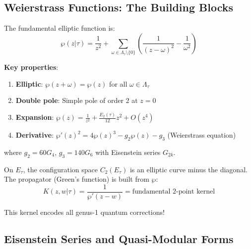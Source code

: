 \subsection{Weierstrass Functions: The Building Blocks}

\begin{definition}
\label{def:weierstrass-p}
The fundamental elliptic function is:
\begin{equation}
\wp(z|\tau) = \frac{1}{z^2} + \sum_{\omega \in \Lambda_\tau \setminus \{0\}} 
\left(\frac{1}{(z-\omega)^2} - \frac{1}{\omega^2}\right)
\end{equation}

\textbf{Key properties}:
\begin{enumerate}
\item \textbf{Elliptic}: $\wp(z + \omega) = \wp(z)$ for all $\omega \in \Lambda_\tau$
\item \textbf{Double pole}: Simple pole of order 2 at $z = 0$
\item \textbf{Expansion}: $\wp(z) = \frac{1}{z^2} + \frac{E_2(\tau)}{12} z^2 + O(z^4)$
\item \textbf{Derivative}: $\wp'(z)^2 = 4\wp(z)^3 - g_2\wp(z) - g_3$ (Weierstrass equation)
\end{enumerate}

where $g_2 = 60G_4$, $g_3 = 140G_6$ with Eisenstein series $G_{2k}$.
\end{definition}

\begin{remark}
\label{rem:wp-config-space}
On $E_\tau$, the configuration space $C_2(E_\tau)$ is an elliptic curve minus the diagonal.
The propagator (Green's function) is built from $\wp$:
\begin{equation}
K(z,w|\tau) = \frac{1}{\wp'(z-w)} = \text{fundamental 2-point kernel}
\end{equation}

This kernel encodes all genus-1 quantum corrections!
\end{remark}

\subsection{Eisenstein Series and Quasi-Modular Forms}

